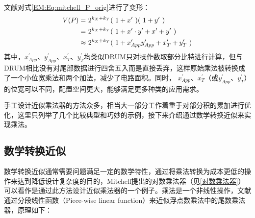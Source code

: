 文献\cite{AC:AM:TOSAM}对式\eqref{EM:Eq:mitchell_P_orig}进行了变形：
\begin{align}
    V(P) = & \ 2^{k_X + k_Y} ( \ 1 + x^{\prime} \ ) ( \ 1 + y^{\prime} \ ) \notag \\
         = & \ 2^{k_X + k_Y} ( \ 1 + x^{\prime} \cdot y^{\prime} + x^{\prime} + y^{\prime} \ ) \notag \\
         \approx & \ 2^{k_X + k_Y} ( \ 1 + x^{\prime}_{App} y^{\prime}_{App} + x^{\prime}_T + y^{\prime}_T \ )
\label{AC:AM:Eq:TOSAM}
\end{align}
其中，$x^{\prime}_{App}$、$y^{\prime}_{App}$、$x^{\prime}_T$、$y^{\prime}_T$均类似DRUM\cite{AC:AM:DRUM}只对操作数取部分比特进行计算，但与DRUM相比没有对尾部数据进行四舍五入而是直接丢弃，这样原始乘法被转换成了一个小位宽乘法和两个加法，减少了电路面积。同时，
$x^{\prime}_{App}$、$x^{\prime}_T$（或$y^{\prime}_{App}$、$y^{\prime}_T$）的位宽可以不同，配置空间更大，能够满足更多种类的应用需求。

手工设计近似乘法器的方法众多，相当大一部分工作着重于对部分积的累加进行优化，这里只列举了几个比较典型和巧妙的示例，接下来介绍通过数学转换近似来实现乘法。

\subsection{数学转换近似}

数学转换近似通常需要问题满足一定的数学特性，通过将乘法转换为成本更低的操作来达到降低设计复杂度的目的，Mitchell提出的对数乘法器\cite{EM:mitchell}（见\ref{对数乘法器}）可以看作是通过此方法设计近似乘法器的一个例子。乘法是一个非线性操作，文献\cite{AC:AM:OU}通过分段线性函数（Piece-wise linear function）来近似浮点数乘法中的尾数乘法器，原理如下：

